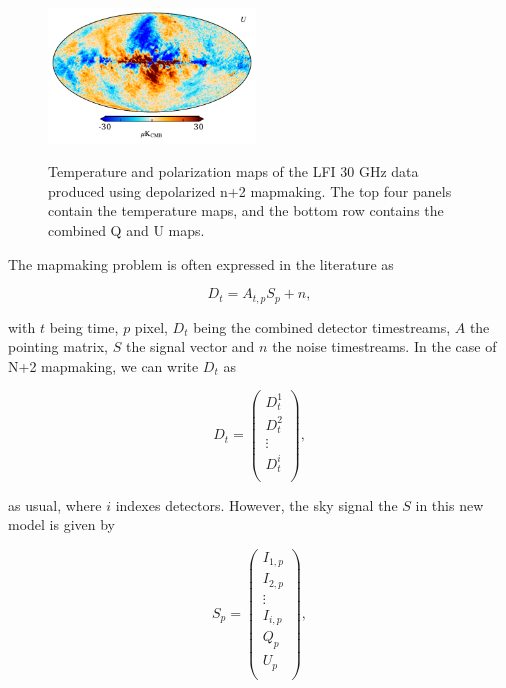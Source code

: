 \documentclass{aa}
\begin{document}
\begin{figure}[!]
  \includegraphics[width=0.49\textwidth]{figs/map_U_depol.pdf}\\
  \caption{Temperature and polarization maps of the LFI 30 GHz data produced using depolarized n+2 mapmaking. The top four panels contain the temperature maps, and the bottom row contains the combined Q and U maps.}
  \label{fig:depolarized}
\end{figure}

The mapmaking problem is often expressed in the literature as \citep{de_Gasperis_2005}

\begin{equation}
D_t = A_{t,p}S_p + n,
\end{equation}

with $t$ being time, $p$ pixel, $D_t$ being the combined detector timestreams, $A$ the pointing matrix, $S$ the signal vector and $n$ the noise timestreams. In the case of N+2 mapmaking, we can write $D_t$ as 

\begin{equation}
D_t = \begin{pmatrix}
D_t^1\\ D_t^2\\ \vdots \\ D_t^i\\
\end{pmatrix},
\end{equation}

as usual, where $i$ indexes detectors. However, the sky signal the $S$ in this new model is given by 

\begin{equation}
S_p = \begin{pmatrix}
I_{1,p}\\
I_{2,p}\\
\vdots\\
I_{i,p}\\
Q_p\\
U_p\\
\end{pmatrix},
\end{equation}
\end{document}
